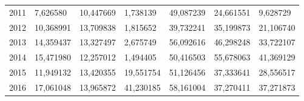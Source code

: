 \begin{table}
\begin{tabular}{p{1cm}p{2cm}p{2cm}p{2cm}p{2cm}p{2cm}p{2cm}}
 2011 &                                     7,626580 &                           10,447669 &     1,738139 & 49,087239 &                    24,661551 &  9,628729 \\
 2012 &                                    10,368991 &                           13,709838 &     1,815652 & 39,732241 &                    35,199873 & 21,106740 \\
 2013 &                                    14,359437 &                           13,327497 &     2,675749 & 56,092616 &                    46,298248 & 33,722107 \\
 2014 &                                    15,471980 &                           12,257012 &     1,494405 & 50,416503 &                    55,678063 & 41,369129 \\
 2015 &                                    11,949132 &                           13,420355 &    19,551754 & 51,126456 &                    37,333641 & 28,556517 \\
 2016 &                                    17,061048 &                           13,965872 &    41,230185 & 58,161004 &                    37,270411 & 37,271873 \\
\bottomrule
\end{tabular}
\end{table}
